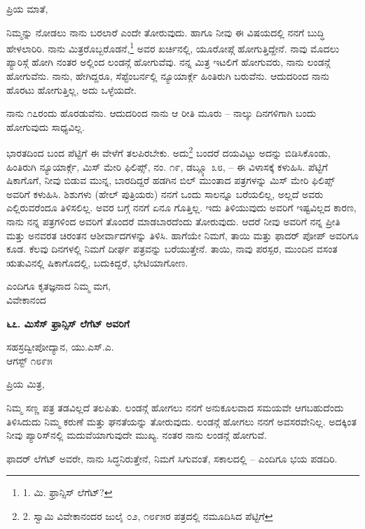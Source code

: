 ಪ್ರಿಯ ಮಾತೆ,

ನಿಮ್ಮನ್ನು ನೋಡಲು ನಾನು ಬರಲಾರೆ ಎಂದೇ ತೋರುವುದು. ಹಾಗೂ ನೀವು ಈ ವಿಷಯದಲ್ಲಿ ನನಗೆ ಬುದ್ಧಿ ಹೇಳಲಾರಿರಿ. ನಾನು ಮಿತ್ರರೊಬ್ಬರೊಡನೆ,\footnote{1. ಮಿ. ಫ್ರಾನ್ಸಿಸ್ ಲೆಗೆಟ್?} ಅವರ ಖರ್ಚಿನಲ್ಲಿ, ಯೂರೋಪ್ಗೆ ಹೋಗುತ್ತಿದ್ದೇನೆ. ನಾವು ಮೊದಲು ಪ್ಯಾರಿಸ್ಗೆ ಹೋಗಿ ನಂತರ ಅಲ್ಲಿಂದ ಲಂಡನ್ಗೆ ಹೋಗುವೆವು. ನನ್ನ ಮಿತ್ರ ಇಟಲಿಗೆ ಹೋಗುವರು, ನಾನು ಲಂಡನ್ಗೆ ಹೋಗುವೆನು. ನಾನು, ಹೇಗಿದ್ದರೂ, ಸೆಪ್ಟೆಂಬರ್ನಲ್ಲಿ ನ್ಯೂಯಾರ್ಕ್ಗೆ ಹಿಂತಿರುಗಿ ಬರುವೆನು. ಆದುದರಿಂದ ನಾನು ಹೊರಟು ಹೋಗುತ್ತಿಲ್ಲ, ಅದು ಒಳ್ಳೆಯದೇ.

ನಾನು ೧೭ರಂದು ಹೊರಡುವೆನು. ಆದುದರಿಂದ ನಾನು ಆ ರೀತಿ ಮೂರು – ನಾಲ್ಕು ದಿನಗಳಿಗಾಗಿ ಬಂದು ಹೋಗುವುದು ಸಾಧ್ಯವಿಲ್ಲ.

ಭಾರತದಿಂದ ಬಂದ ಪೆಟ್ಟಿಗೆ ಈ ವೇಳೆಗೆ ತಲಪಿರಬೇಕು. ಅದು\footnote{2. ಸ್ವಾಮಿ ವಿವೇಕಾನಂದರ ಜುಲೈ ೦೨, ೧೮೯೫ರ ಪತ್ರದಲ್ಲಿ ನಮೂದಿಸಿದ ಪೆಟ್ಟಿಗೆ} ಬಂದರೆ ದಯವಿಟ್ಟು ಅದನ್ನು ಬಿಡಿಸಿಕೊಂಡು, ಹಿಂತಿರುಗಿ ನ್ಯೂಯಾರ್ಕ್ಗೆ, ಮಿಸ್ ಮೇರಿ ಫಿಲಿಪ್ಸ್, ನಂ. ೧೯, ಡಬ್ಲ್ಯೂ ೩೮, – ಈ ವಿಳಾಸಕ್ಕೆ ಕಳುಹಿಸಿ. ಪೆಟ್ಟಿಗೆ ಷಿಕಾಗೊಗೆ, ನೀವು ಬಿಡುವ ಮುನ್ನ, ಬಾರದಿದ್ದರೆ ಹಡಗಿನ ಬಿಲ್ ಮುಂತಾದ ಪತ್ರಗಳನ್ನು ಮಿಸ್ ಮೇರಿ ಫಿಲಿಪ್ಸ್ ಅವರಿಗೆ ಕಳುಹಿಸಿ. ಶಿಶುಗಳು (ಹೇಲ್ ಪುತ್ರಿಯರು) ನನಗೆ ಒಂದು ಸಾಲನ್ನೂ ಬರೆಯಲಿಲ್ಲ, ಅಲ್ಲದೆ ಅವರು ಎಲ್ಲಿರುವರೆಂದೂ ತಿಳಿಸಲಿಲ್ಲ. ಅವರ ಬಗ್ಗೆ ನನಗೆ ಏನೂ ಗೊತ್ತಿಲ್ಲ. ಇದು ತಿಳಿಯುವುದು ಅವರಿಗೆ ಇಷ್ಟವಿಲ್ಲದ ಕಾರಣ, ನಾನು ನನ್ನ ಪತ್ರಗಳಿಂದ ಅವರಿಗೆ ತೊಂದರೆ ಮಾಡಬಾರದೆಂದು ತೋರುವುದು. ಆದರೆ ನೀವು ಅವರಿಗೆ ನನ್ನ ಪ್ರೀತಿ ಮತ್ತು ಅನವರತ ಚಿರಂತನ ಆಶೀರ್ವಾದಗಳನ್ನು ತಿಳಿಸಿ. ಹಾಗೆಯೇ ನಿಮಗೆ, ತಾಯಿ ಮತ್ತು ಫಾದರ್ ಪೋಪ್ ಅವರಿಗೂ ಕೂಡ. ಕೆಲವು ದಿನಗಳಲ್ಲಿ ನಿಮಗೆ ದೀರ್ಘ ಪತ್ರವನ್ನು ಬರೆಯುತ್ತೇನೆ. ತಾಯಿ, ನಾವು ಪರಸ್ಪರ, ಮುಂದಿನ ವಸಂತ ಋತುವಿನಲ್ಲಿ ಷಿಕಾಗೊದಲ್ಲಿ, ಬದುಕಿದ್ದರೆ, ಭೇಟಿಯಾಗೋಣ.

\begin{flushright}
ಎಂದಿಗೂ ಕೃತಜ್ಞನಾದ ನಿಮ್ಮ ಮಗ,\\ವಿವೇಕಾನಂದ
\end{flushright}

\begin{center}
\textbf{೬೭. ಮಿಸೆಸ್ ಫ್ರಾನ್ಸಿಸ್ ಲೆಗೆಟ್ ಅವರಿಗೆ}
\end{center}

\begin{flushright}
ಸಹಸ್ರದ್ವೀಪೋದ್ಯಾನ, ಯು.ಎಸ್.ಎ.\\ಆಗಸ್ಟ್ ೧೮೯೫
\end{flushright}

ಪ್ರಿಯ ಮಿತ್ರ,

ನಿಮ್ಮ ಸಣ್ಣ ಪತ್ರ ತಡವಿಲ್ಲದೆ ತಲಪಿತು. ಲಂಡನ್ಗೆ ಹೋಗಲು ನನಗೆ ಅನುಕೂಲವಾದ ಸಮಯವೇ ಆಗಬಹುದೆಂದು ತಿಳಿಸಿದುದು ನಿಮ್ಮ ಕರುಣೆ ಮತ್ತು ಘನತೆಯನ್ನು ತೋರುವುದು. ಲಂಡನ್ಗೆ ಹೋಗಲು ನನಗೆ ಅವಸರವೇನಿಲ್ಲ. ಅದಕ್ಕಿಂತ ನೀವು ಪ್ಯಾರಿಸ್‌ನಲ್ಲಿ ಮದುವೆಯಾಗುವುದೇ ಮುಖ್ಯ. ನಂತರ ನಾನು ಲಂಡನ್ಗೆ ಹೋಗುವೆ.

ಫಾದರ್ ಲೆಗೆಟ್ ಅವರೇ, ನಾನು ಸಿದ್ಧನಿರುತ್ತೇನೆ, ನಿಮಗೆ ಸಿಗುವಂತೆ, ಸಕಾಲದಲ್ಲಿ – ಎಂದಿಗೂ ಭಯ ಪಡದಿರಿ.

